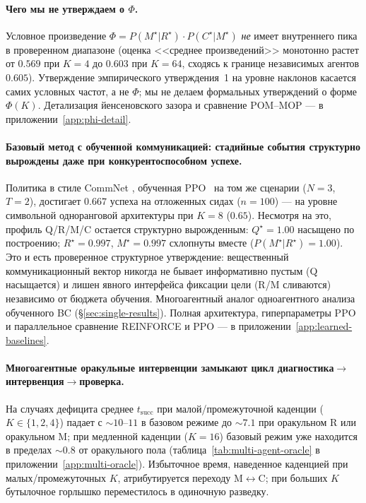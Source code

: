 \documentclass{article}
\begin{document}
\paragraph{Чего мы не утверждаем о $\Phi$.} Условное произведение $\Phi = P(M^\star|R^\star)\!\cdot\!P(C^\star|M^\star)$ \emph{не} имеет внутреннего пика в проверенном диапазоне (оценка <<среднее произведений>> монотонно растет от $0.569$ при $K{=}4$ до $0.603$ при $K{=}64$, сходясь к границе независимых агентов $0.605$). Утверждение эмпирического утверждения~1 на уровне наклонов касается самих условных частот, а не $\Phi$; мы не делаем формальных утверждений о форме $\Phi(K)$. Детализация йенсеновского зазора и сравнение POM--MOP --- в приложении~\ref{app:phi-detail}.

\paragraph{Базовый метод с обученной коммуникацией: стадийные события структурно вырождены даже при конкурентоспособном успехе.}
Политика в стиле CommNet \citep{sukhbaatar2016commnet}, обученная PPO~\citep{schulman2017proximal} на том же сценарии ($N{=}3$, $T{=}2$), достигает $0.667$ успеха на отложенных сидах ($n{=}100$) --- на уровне символьной одноранговой архитектуры при $K{=}8$ ($0.65$). Несмотря на это, профиль Q/R/M/C остается структурно вырожденным: $Q^\star{=}1.00$ насыщено по построению; $R^\star{=}0.997$, $M^\star{=}0.997$ схлопнуты вместе ($P(M^\star|R^\star){=}1.00$). Это и есть проверенное структурное утверждение: вещественный коммуникационный вектор никогда не бывает информативно пустым (Q насыщается) и лишен явного интерфейса фиксации цели (R/M сливаются) независимо от бюджета обучения. Многоагентный аналог одноагентного анализа обученного BC (\S\ref{sec:single-results}). Полная архитектура, гиперпараметры PPO и параллельное сравнение REINFORCE и PPO --- в приложении~\ref{app:learned-baselines}.

\paragraph{Многоагентные оракульные интервенции замыкают цикл диагностика$\to$интервенция$\to$проверка.}
На случаях дефицита среднее $t_{\mathrm{succ}}$ при малой/промежуточной каденции ($K{\in}\{1,2,4\}$) падает с $\sim10$--$11$ в базовом режиме до $\sim7.1$ при оракульном R или оракульном M; при медленной каденции ($K{=}16$) базовый режим уже находится в пределах $\sim0.8$ от оракульного пола (таблица~\ref{tab:multi-agent-oracle} в приложении~\ref{app:multi-oracle}). Избыточное время, наведенное каденцией при малых/промежуточных $K$, атрибутируется переходу M$\leftrightarrow$C; при больших $K$ бутылочное горлышко переместилось в одиночную разведку.
\end{document}
